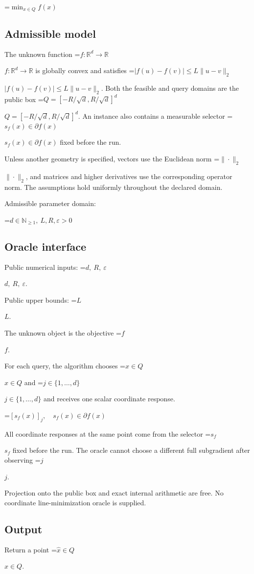 \documentclass[10pt,a4paper]{article}
\newcommand{\AtlasMath}[1]{\par\begingroup\centering\setbox0=\hbox{$\displaystyle #1$}\ifdim\wd0>1.4\linewidth\typeout{ATLAS WIDE FORMULA: \the\wd0}\fi\ifdim\wd0>\linewidth\resizebox{\linewidth}{!}{\box0}\else\box0\fi\par\endgroup}
\newcommand{\AtlasInlineMath}[1]{\begingroup\setbox0=\hbox{$#1$}\ifdim\wd0>.4\linewidth\endgroup\AtlasMath{#1}\else\endgroup$#1$\fi}
\begin{document}
\AtlasMath{\min_{x\in Q}f(x)}


\subsection{Admissible model}
The unknown function \AtlasInlineMath{f:\mathbb R^d\to\mathbb R} is globally convex and satisfies \AtlasInlineMath{|f(u)-f(v)|\le L\|u-v\|_2}. Both the feasible and query domains are the public box \AtlasInlineMath{Q=[-R/\sqrt d,R/\sqrt d]^d}. An instance also contains a measurable selector \AtlasInlineMath{s_f(x)\in\partial f(x)} fixed before the run.

Unless another geometry is specified, vectors use the Euclidean norm \AtlasInlineMath{\|\cdot\|_2}, and matrices and higher derivatives use the corresponding operator norm. The assumptions hold uniformly throughout the declared domain.

Admissible parameter domain:


\AtlasMath{d\in\mathbb{N}_{\ge1},\ L,R,\varepsilon>0}


\subsection{Oracle interface}
Public numerical inputs: \AtlasInlineMath{d,\ R,\ \varepsilon}.

Public upper bounds: \AtlasInlineMath{L}.

The unknown object is the objective \AtlasInlineMath{f}.

For each query, the algorithm chooses \AtlasInlineMath{x\in Q} and \AtlasInlineMath{j\in\{1,\ldots,d\}} and receives one scalar coordinate response.


\AtlasMath{[s_f(x)]_j,\quad s_f(x)\in\partial f(x)}


All coordinate responses at the same point come from the selector \AtlasInlineMath{s_f} fixed before the run. The oracle cannot choose a different full subgradient after observing \AtlasInlineMath{j}.

Projection onto the public box and exact internal arithmetic are free. No coordinate line-minimization oracle is supplied.

\subsection{Output}
Return a point \AtlasInlineMath{\widehat x\in Q}.
\end{document}
